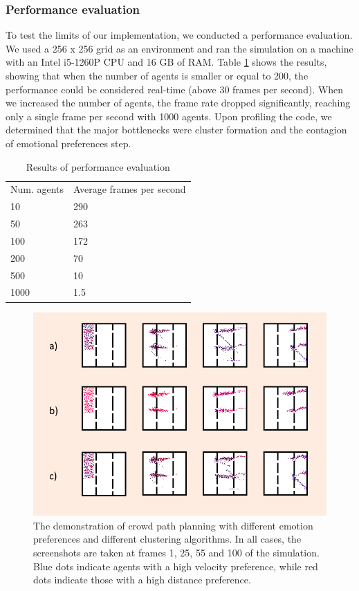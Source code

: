 \documentclass[9pt]{pnas-new}
\begin{document}
\subsubsection{Performance evaluation} To test the limits of our implementation, we conducted a performance evaluation. We used a 256 x 256 grid as an environment and ran the simulation on a machine with an Intel i5-1260P CPU and 16 GB of RAM. Table \ref{tbl:preformance} shows the results, showing that when the number of agents is smaller or equal to 200, the performance could be considered real-time (above 30 frames per second). When we increased the number of agents, the frame rate dropped significantly, reaching only a single frame per second with 1000 agents. Upon profiling the code, we determined that the major bottlenecks were cluster formation and the contagion of emotional preferences step. 
\begin{table}[h!]
\begin{tabular}{ll}
Num. agents & Average frames per second \\
10          & 290         \\
50          & 263         \\
100         & 172         \\
200         & 70          \\
500         & 10          \\
1000        & 1.5          
\end{tabular}
\caption{Results of performance evaluation}
\label{tbl:preformance}
\end{table}

\begin{figure}[h!]
    \centering
    \includegraphics[width=\linewidth]{fig/clustering.png}
    \caption{The demonstration of crowd path planning with different emotion preferences and different clustering algorithms. In all cases, the screenshots are taken at frames 1, 25, 55 and 100 of the simulation. Blue dots indicate agents with a high velocity preference, while red dots indicate those with a high distance preference.}
    \label{fig:demo}
\end{figure}
\end{document}

